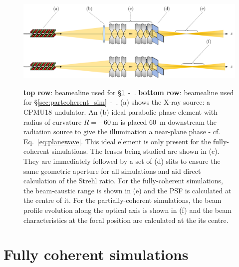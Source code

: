 \begin{refsection}
\begin{figure}[t]
        \centering
        {\includegraphics[width=0.8\linewidth]{figures/ch05/optical_setups.png}}
        \caption[Beamlines for coherent- and partially-coherent simulations]{\textbf{top row}: beamealine used for  \S\ref{sec:coherent_sim}~-~\textit{}. \textbf{bottom row}: beamealine used for  \S\ref{sec:partcoherent_sim}~-~\textit{}. (a) shows the X-ray source: a CPMU18 undulator. An (b) ideal parabolic phase element with radius of curvature $R=-60~$m is placed 60~m downstream the radiation source to give the illumination a near-plane phase - cf. Eq.~\ref{eq:planewave}. This ideal element is only present for the fully-coherent simulations. The lenses being studied are shown in (c). They are immediately followed by a set of (d) slits to ensure the same geometric aperture for all simulations and aid direct calculation of the Strehl ratio. For the fully-coherent simulations, the beam-caustic range is shown in (e) and the PSF is calculated at the centre of it. For the partially-coherent simulations, the beam profile evolution along the optical axis is shown in (f) and the beam characteristics at the focal position are calculated at the its centre. 
        }\label{fig:optical_setups}
\end{figure}

\section{Fully coherent simulations}\label{sec:coherent_sim}


\end{refsection}
